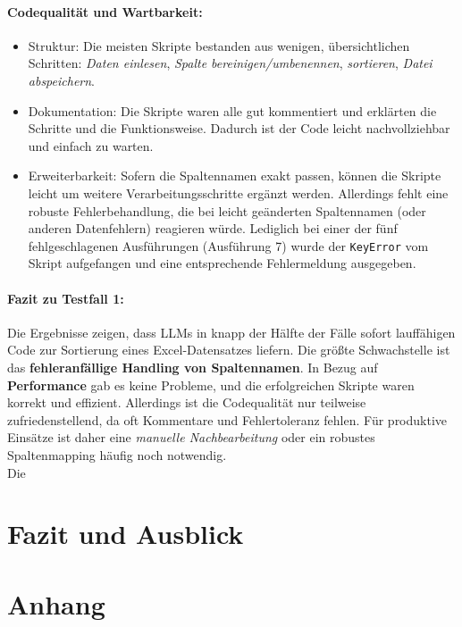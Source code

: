\documentclass[11pt,a4paper]{article}
\begin{document}
\paragraph{Codequalität und Wartbarkeit:}
\begin{itemize}
    \item Struktur: Die meisten Skripte bestanden aus wenigen, übersichtlichen Schritten: \emph{Daten einlesen}, \emph{Spalte bereinigen/umbenennen}, \emph{sortieren}, \emph{Datei abspeichern}.
    \item Dokumentation: Die Skripte waren alle gut kommentiert und erklärten die Schritte und die Funktionsweise. Dadurch ist der Code leicht nachvollziehbar und einfach zu warten.
    \item Erweiterbarkeit: Sofern die Spaltennamen exakt passen, können die Skripte leicht um weitere Verarbeitungsschritte ergänzt werden. Allerdings fehlt eine robuste Fehlerbehandlung, die bei leicht geänderten Spaltennamen (oder anderen Datenfehlern) reagieren würde. Lediglich bei einer der fünf fehlgeschlagenen Ausführungen (Ausführung 7) wurde der \verb|KeyError| vom Skript aufgefangen und eine entsprechende Fehlermeldung ausgegeben.
\end{itemize}

\paragraph{Fazit zu Testfall 1:}
Die Ergebnisse zeigen, dass LLMs in knapp der Hälfte der Fälle sofort lauffähigen Code zur Sortierung eines Excel-Datensatzes liefern. Die größte Schwachstelle ist das \textbf{fehleranfällige Handling von Spaltennamen}. In Bezug auf \textbf{Performance} gab es keine Probleme, und die erfolgreichen Skripte waren korrekt und effizient. Allerdings ist die Codequalität nur teilweise zufriedenstellend, da oft Kommentare und Fehlertoleranz fehlen. Für produktive Einsätze ist daher eine \emph{manuelle Nachbearbeitung} oder ein robustes Spaltenmapping häufig noch notwendig.\\
Die 

\section{Fazit und Ausblick}
\label{sec:fazit}

\newpage
\section{Anhang}
\label{sec:anhang}
\end{document}
